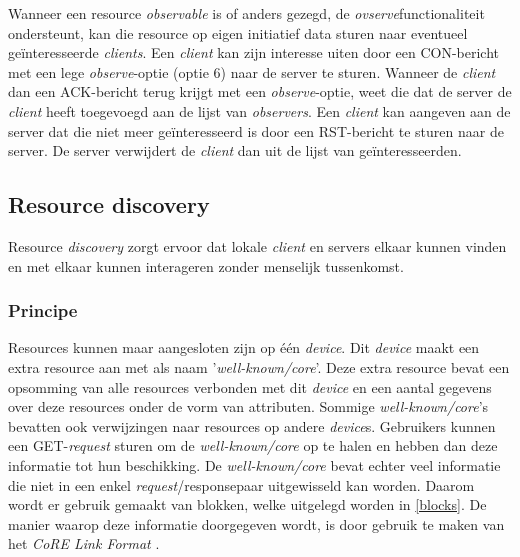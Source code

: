 Wanneer een resource \textit{observable} is of anders gezegd, de \textit{ovserve}functionaliteit ondersteunt, kan die resource op eigen initiatief data sturen naar eventueel ge\"{i}nteresseerde \textit{clients}. Een \textit{client} kan zijn interesse uiten door een CON-bericht met een lege \textit{observe}-optie (optie 6) naar de server te sturen. Wanneer de \textit{client} dan een ACK-bericht terug krijgt met een \textit{observe}-optie, weet die dat de server de \textit{client} heeft toegevoegd aan de lijst van \textit{observers}. Een \textit{client} kan aangeven aan de server dat die niet meer ge\"{i}nteresseerd is door een RST-bericht te sturen naar de server. De server verwijdert de \textit{client} dan uit de lijst van ge\"{i}nteresseerden.

\subsection{Resource discovery} \label{resourceDiscovery}
Resource \textit{discovery} zorgt ervoor dat lokale \textit{client} en servers elkaar kunnen vinden en met elkaar kunnen interageren zonder menselijk tussenkomst.

\subsubsection{Principe}
\noindent
Resources kunnen maar aangesloten zijn op \'{e}\'{e}n \textit{device}. Dit \textit{device} maakt een extra resource aan met als naam '\textit{well-known/core}'. Deze extra resource bevat een opsomming van alle resources verbonden met dit \textit{device} en een aantal gegevens over deze resources onder de vorm van attributen. Sommige \textit{well-known/core}'s bevatten ook verwijzingen naar resources op andere \textit{device}s. Gebruikers kunnen een GET-\textit{request} sturen om de \textit{well-known/core} op te halen en hebben dan deze informatie tot hun beschikking. De \textit{well-known/core} bevat echter veel informatie die niet in een enkel \textit{request}/responsepaar uitgewisseld kan worden. Daarom wordt er gebruik gemaakt van blokken, welke uitgelegd worden in \ref{blocks}. De manier waarop deze informatie doorgegeven wordt, is door gebruik te maken van het \textit{CoRE Link Format} \cite{coapDiscovery}.

